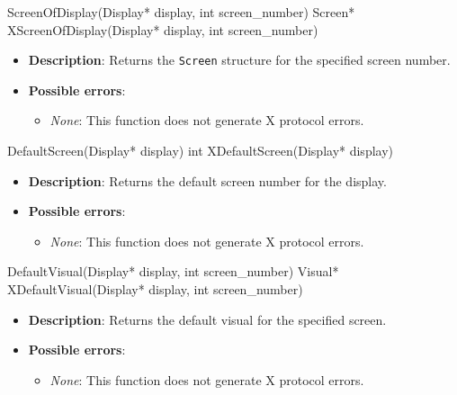 \documentclass{report}
\begin{document}
\begin{itemize}
        \begin{cppcode}
            ScreenOfDisplay(Display* display, int screen_number)
            Screen* XScreenOfDisplay(Display* display, int screen_number)
        \end{cppcode}
        \begin{itemize}
            \item \textbf{Description}: Returns the \texttt{Screen} structure for the specified screen number.
            \item \textbf{Possible errors}:
                \begin{itemize}
                    \item \textit{None}: This function does not generate X protocol errors.
                \end{itemize}
        \end{itemize}

        \begin{cppcode}
            DefaultScreen(Display* display)
            int XDefaultScreen(Display* display)
        \end{cppcode}
        \begin{itemize}
            \item \textbf{Description}: Returns the default screen number for the display.
            \item \textbf{Possible errors}:
                \begin{itemize}
                    \item \textit{None}: This function does not generate X protocol errors.
                \end{itemize}
        \end{itemize}

        \begin{cppcode}
            DefaultVisual(Display* display, int screen_number)
            Visual* XDefaultVisual(Display* display, int screen_number)
        \end{cppcode}
        \begin{itemize}
            \item \textbf{Description}: Returns the default visual for the specified screen.
            \item \textbf{Possible errors}:
                \begin{itemize}
                    \item \textit{None}: This function does not generate X protocol errors.
                \end{itemize}
        \end{itemize}


\end{itemize}
\end{document}
